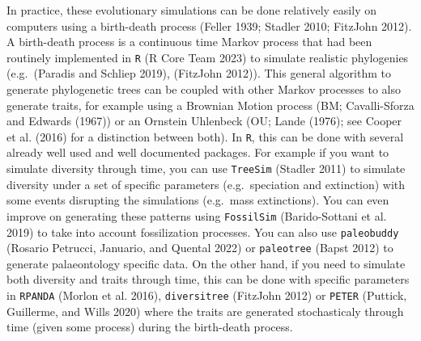 \documentclass[
]{article}
\begin{document}
In practice, these evolutionary simulations can be done relatively
easily on computers using a birth-death process (Feller 1939; Stadler
2010; FitzJohn 2012). A birth-death process is a continuous time Markov
process that had been routinely implemented in \texttt{R} (R Core Team
2023) to simulate realistic phylogenies (e.g.~(Paradis and Schliep
2019), (FitzJohn 2012)). This general algorithm to generate phylogenetic
trees can be coupled with other Markov processes to also generate
traits, for example using a Brownian Motion process (BM; Cavalli-Sforza
and Edwards (1967)) or an Ornstein Uhlenbeck (OU; Lande (1976); see
Cooper et al. (2016) for a distinction between both). In \texttt{R},
this can be done with several already well used and well documented
packages. For example if you want to simulate diversity through time,
you can use \texttt{TreeSim} (Stadler 2011) to simulate diversity under
a set of specific parameters (e.g.~speciation and extinction) with some
events disrupting the simulations (e.g.~mass extinctions). You can even
improve on generating these patterns using \texttt{FossilSim}
(Barido-Sottani et al. 2019) to take into account fossilization
processes. You can also use \texttt{paleobuddy} (Rosario Petrucci,
Januario, and Quental 2022) or \texttt{paleotree} (Bapst 2012) to
generate palaeontology specific data. On the other hand, if you need to
simulate both diversity and traits through time, this can be done with
specific parameters in \texttt{RPANDA} (Morlon et al. 2016),
\texttt{diversitree} (FitzJohn 2012) or \texttt{PETER} (Puttick,
Guillerme, and Wills 2020) where the traits are generated stochasticaly
through time (given some process) during the birth-death process.
\end{document}

